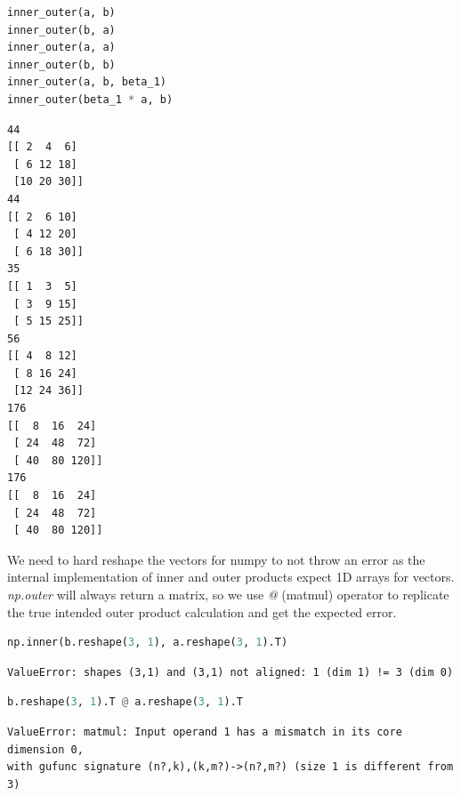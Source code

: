 \documentclass[11pt,letterpaper]{article}
\begin{document}
\begin{enumerate}
\begin{enumerate}
\begin{lstlisting}[language=python]
inner_outer(a, b)
inner_outer(b, a)
inner_outer(a, a)
inner_outer(b, b)
inner_outer(a, b, beta_1)
inner_outer(beta_1 * a, b)
\end{lstlisting}
\begin{verbatim}
44
[[ 2  4  6]
 [ 6 12 18]
 [10 20 30]]
44
[[ 2  6 10]
 [ 4 12 20]
 [ 6 18 30]]
35
[[ 1  3  5]
 [ 3  9 15]
 [ 5 15 25]]
56
[[ 4  8 12]
 [ 8 16 24]
 [12 24 36]]
176
[[  8  16  24]
 [ 24  48  72]
 [ 40  80 120]]
176
[[  8  16  24]
 [ 24  48  72]
 [ 40  80 120]]
\end{verbatim}
We need to hard reshape the vectors for numpy to not throw an error as the internal
implementation of inner and outer products expect 1D arrays for vectors. 
\textit{np.outer} will always return a matrix, so we use \textit{@} (matmul) operator
to replicate the true intended outer product calculation and get the expected error.
\begin{lstlisting}[language=python]
np.inner(b.reshape(3, 1), a.reshape(3, 1).T)
\end{lstlisting}
\begin{verbatim}
ValueError: shapes (3,1) and (3,1) not aligned: 1 (dim 1) != 3 (dim 0)
\end{verbatim}
\begin{lstlisting}[language=python]
b.reshape(3, 1).T @ a.reshape(3, 1).T
\end{lstlisting}
\begin{verbatim}
ValueError: matmul: Input operand 1 has a mismatch in its core dimension 0, 
with gufunc signature (n?,k),(k,m?)->(n?,m?) (size 1 is different from 3)
\end{verbatim}
\end{enumerate}
\end{enumerate}
\end{document}
